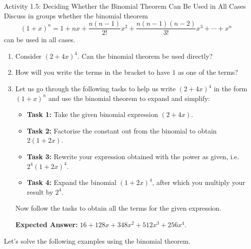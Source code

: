 \begin{activity}{Activity 1.5: Deciding Whether the Binomial Theorem Can Be Used in All Cases}
Discuss in groups whether the binomial theorem
\[
  (1+x)^n = 1 + nx + \frac{n(n-1)}{2!}x^2 + \frac{n(n-1)(n-2)}{3!}x^3 + \cdots + x^n
\]
can be used in all cases.
\begin{enumerate}
  \item Consider $(2+4x)^4$. Can the binomial theorem be used directly?
  \item How will you write the terms in the bracket to have $1$ as one of the terms?
  \item Let us go through the following tasks to help us write $(2+4x)^4$ in the
  form $(1+x)^n$ and use the binomial theorem to expand and simplify:
  \begin{itemize}
    \item[] \textbf{Task 1:} Take the given binomial expression $(2+4x)$.
    \item[] \textbf{Task 2:} Factorise the constant out from the binomial to obtain $2(1+2x)$.
    \item[] \textbf{Task 3:} Rewrite your expression obtained with the power as given, i.e.\ $2^4(1+2x)^4$.
    \item[] \textbf{Task 4:} Expand the binomial $(1+2x)^4$, after which you multiply your result by $2^4$.
  \end{itemize}
  Now follow the tasks to obtain all the terms for the given expression.

  \textbf{Expected Answer:} $16 + 128x + 348x^2 + 512x^3 + 256x^4$.
\end{enumerate}
\end{activity}

Let's solve the following examples using the binomial theorem.


